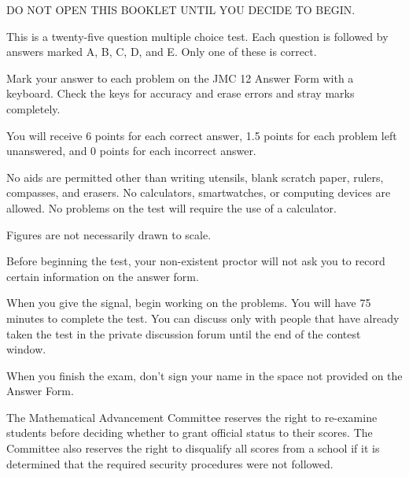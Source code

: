 \documentclass[10pt, twoside]{article}
\newcommand{\contestNumber}{12}
\begin{document}
\begin{justify}
\begin{enumerate}[noitemsep, nolistsep, leftmargin=*]

\normalsize{
\item DO NOT OPEN THIS BOOKLET UNTIL YOU DECIDE TO BEGIN.
\item This is a twenty-five question multiple choice test. Each question is followed by answers marked A, B, C, D, and E. Only one of these is correct.
\item Mark your answer to each problem on the JMC {\contestNumber} Answer Form with a keyboard. Check the keys for accuracy and erase errors and stray marks completely.
\item You will receive 6 points for each correct answer, 1.5 points for each problem left unanswered, and 0 points for each incorrect answer.
\item No aids are permitted other than writing utensils, blank scratch paper, rulers, compasses, and erasers. No calculators, smartwatches, or computing devices are allowed. No problems on the test will require the use of a calculator.
\item Figures are not necessarily drawn to scale.
\item Before beginning the test, your non-existent proctor will not ask you to record certain information on the answer form. 
\item When you give the signal, begin working on the problems. You will have 75 minutes to complete the test. You can discuss only with people that have already taken the test in the private discussion forum until the end of the contest window.
\item When you finish the exam, don't sign your name in the space not provided on the Answer Form.
}

\end{enumerate}

\vspace{-4mm}

\begin{center} \noindent\hrulefill \end{center}

\vspace{-5mm}

\scriptsize{
\begin{justify}
The Mathematical Advancement Committee reserves the right to re-examine students before deciding whether to grant official status to their scores. The Committee also reserves the right to disqualify all scores from a school if it is determined that the required security procedures were not followed.
\end{justify}

}
\end{justify}
\end{document}

